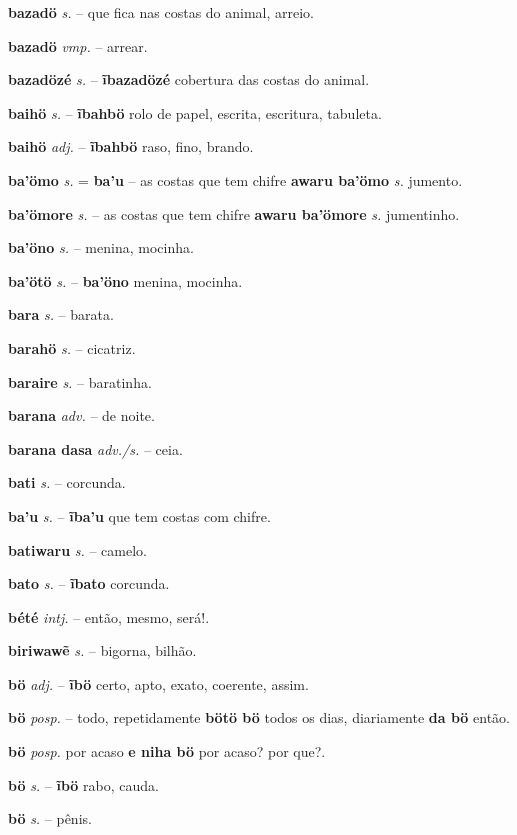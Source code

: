 \textbf{bazadö} \textit{s.} -- que fica nas costas do animal, arreio.

\textbf{bazadö} \textit{vmp.} -- arrear.

\textbf{bazadözé} \textit{s.} -- \textbf{ĩbazadözé} cobertura das costas do animal.

\textbf{baihö} \textit{s.} -- \textbf{ĩbahbö} rolo de papel, escrita, escritura, tabuleta.

\textbf{baihö} \textit{adj.} -- \textbf{ĩbahbö} raso, fino, brando.

\textbf{ba'ömo} \textit{s.} = \textbf{ba'u} -- as costas que tem chifre  \textbf{awaru ba'ömo} \textit{s.} jumento.

\textbf{ba'ömore} \textit{s.} -- as costas que tem chifre  \textbf{awaru ba'ömore} \textit{s.} jumentinho.

\textbf{ba'öno} \textit{s.} -- menina, mocinha.

\textbf{ba'ötö} \textit{s.} -- \textbf{ba'öno} menina, mocinha.

\textbf{bara} \textit{s.} -- barata.

\textbf{barahö} \textit{s.} -- cicatriz.

\textbf{baraire} \textit{s.} -- baratinha.

\textbf{barana} \textit{adv.} -- de noite.

\textbf{barana dasa} \textit{adv./s.} -- ceia.

\textbf{bati} \textit{s.} -- corcunda.

\textbf{ba'u} \textit{s.} -- \textbf{ĩba'u} que tem costas com chifre.

\textbf{batiwaru} \textit{s.} -- camelo.

\textbf{bato} \textit{s.} -- \textbf{ĩbato} corcunda.

\textbf{bété} \textit{intj.} -- então, mesmo, será!.

\textbf{biriwawẽ} \textit{s.} -- bigorna, bilhão.

\textbf{bö} \textit{adj.} -- \textbf{ĩbö} certo, apto, exato, coerente, assim.

\textbf{bö} \textit{posp.} -- todo, repetidamente  \textbf{bötö bö} todos os dias, diariamente  \textbf{da bö} então.

\textbf{bö} \textit{posp.} por acaso  \textbf{e niha bö} por acaso? por que?.

\textbf{bö} \textit{s.} -- \textbf{ĩbö} rabo, cauda.

\textbf{bö} \textit{s.} -- pênis.

